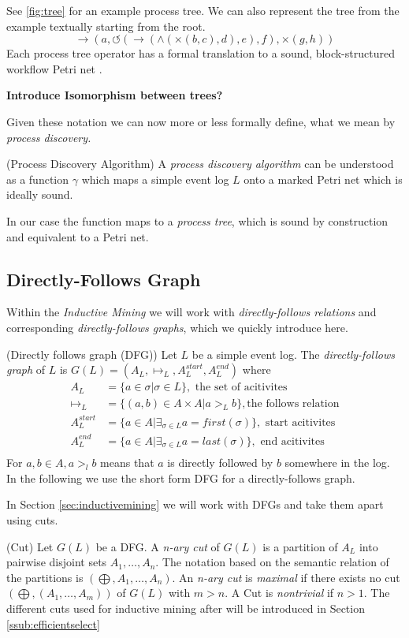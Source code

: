 \documentclass[a4paper]{IEEEtran}
\begin{document}
See \ref{fig:tree} for an example process tree. We can also represent the tree from the example textually starting from the root.
\begin{equation}
    \rightarrow(a, \circlearrowleft(\rightarrow(\wedge(\times(b,c),d),e),f), \times(g,h))
\end{equation}
Each process tree operator has a formal translation to a sound, block-structured workflow Petri net \cite{buijs2012treetranslation}.

\textbf{Introduce Isomorphism between trees?}

Given these notation we can now more or less formally define, what we mean by \textit{process discovery.}
\begin{defn} (Process Discovery Algorithm) \cite{process_mining}
A \textit{process discovery algorithm} can be understood as a function $\gamma$ which maps a simple event log $L$ onto a marked Petri net which is ideally sound. 
\end{defn}
In our case the function maps to a \textit{process tree}, which is sound by construction and equivalent to a Petri net.


\subsection{Directly-Follows Graph}
Within the \textit{Inductive Mining} we will work with \textit{directly-follows relations} and corresponding \textit{directly-follows graphs}, which we quickly introduce here. 
\begin{defn}(Directly follows graph (DFG)) Let $L$ be a simple event log. The \textit{directly-follows graph } of $L$ is $G(L) = ( A_L, \mapsto_L, A_L^{start}, A_L^{end})$ where 
\begin{align}
    A_L &= \{ a \in \sigma | \sigma \in L\}, \text{ the set of acitivites} \\
    \mapsto_L &= \{ (a,b) \in A \times A | a >_L b \}, \text{the follows relation} \\
    A_L^{start} &= \{ a \in A | \exists_{\sigma \in L} a = first(\sigma) \}, \text{ start acitivites} \\
    A_L^{end} &= \{ a \in A | \exists_{\sigma \in L} a = last(\sigma) \}, \text{ end acitivites} \\
\end{align}
For $a, b \in A, a >_l b$ means that $a$ is directly followed by $b$ somewhere in the log. In the following we use the short form DFG for a directly-follows graph.
\end{defn}
In Section \ref{sec:inductivemining} we will work with DFGs and take them apart using cuts.
\begin{defn} (Cut) Let $G(L)$ be a DFG. A \textit{n-ary cut} of $G(L)$ is a partition of $A_L$ into pairwise disjoint sets $A_1, \dots, A_n$. The notation based on the semantic relation of the partitions is $(\bigoplus, A_1, \dots, A_n)$. An \textit{n-ary cut} is \textit{maximal} if there exists no cut $(\bigoplus, (A_1, \dots, A_{m}))$ of $G(L)$ with $m > n$. A Cut is \textit{nontrivial} if $n > 1$. The different cuts used for inductive mining after \cite{inductivemining-constructive} will be introduced in Section \ref{ssub:efficientselect}
\end{defn}
\end{document}
